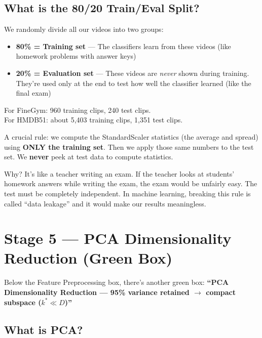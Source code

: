 \documentclass[12pt, a4paper]{article}
\begin{document}
\subsection{What is the 80/20 Train/Eval Split?}

\begin{keybox}
We randomly divide all our videos into two groups:
\begin{itemize}
    \item \textbf{80\% = Training set} — The classifiers learn from these videos (like homework problems with answer keys)
    \item \textbf{20\% = Evaluation set} — These videos are \textit{never} shown during training. They're used only at the end to test how well the classifier learned (like the final exam)
\end{itemize}
For FineGym: 960 training clips, 240 test clips.\\
For HMDB51: about 5,403 training clips, 1,351 test clips.
\end{keybox}

\begin{warnbox}
A crucial rule: we compute the StandardScaler statistics (the average and spread) using \textbf{ONLY the training set}. Then we apply those same numbers to the test set. We \textbf{never} peek at test data to compute statistics.

Why? It's like a teacher writing an exam. If the teacher looks at students' homework answers while writing the exam, the exam would be unfairly easy. The test must be completely independent. In machine learning, breaking this rule is called ``data leakage'' and it would make our results meaningless.
\end{warnbox}

\newpage
\section{Stage 5 — PCA Dimensionality Reduction (Green Box)}

Below the Feature Preprocessing box, there's another green box: \textbf{``PCA Dimensionality Reduction — 95\% variance retained $\rightarrow$ compact subspace ($k^* \ll D$)''}

\subsection{What is PCA?}
\end{document}
